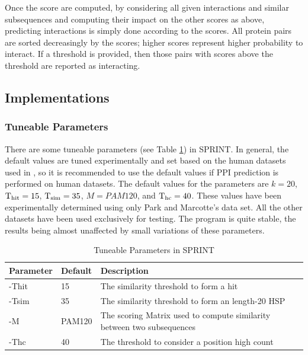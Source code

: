 Once the score are computed, by considering all given interactions and similar subsequences and computing their impact on the other scores as above, predicting interactions is simply done according to the scores. All protein pairs are sorted decreasingly by the scores; higher scores represent higher probability to interact. If a threshold is provided, then those pairs with scores above the threshold are reported as interacting. 

\subsection{Implementations}
\subsubsection{Tuneable Parameters}
\label{sec:parameter}
There are some tuneable parameters (see Table \ref{tab_parameter_SPRINT}) in SPRINT. In general, the default values are tuned experimentally and set based on the human datasets used in \cite{li2017sprint}, so it is recommended to use the default values if PPI prediction is performed on human datasets. The default values for the parameters are $k = 20$, $\operatorname{T_{\rm hit}} = 15$, $\operatorname{T_{\rm sim}} = 35$, $M=PAM120$, and $\operatorname{T_{\rm hc}} = 40$. These values have been experimentally determined using only Park and Marcotte's data set. All the other datasets have been used exclusively for testing. The program is quite stable, the results being almost unaffected by small variations of these parameters.
\begin{table}[]
\begin{adjustwidth}{-2.5cm}{}
\caption{Tuneable Parameters in SPRINT}
\begin{tabular}{@{}lll@{}}
\toprule
Parameter & Default           & Description                                                        \\ \midrule
-Thit      & 15        & The similarity threshold to form a hit                             \\
-Tsim      & 35        & The similarity threshold to form an length-20 HSP                  \\
-M         & PAM120        & The scoring Matrix used to compute similarity between two subsequences \\
-Thc       & 40 & The threshold to consider a position high count                    \\ \bottomrule
\end{tabular}
\label{tab_parameter_SPRINT}
\end{adjustwidth}
\end{table}

